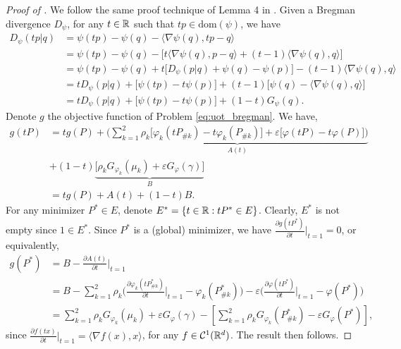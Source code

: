 \begin{proof}[Proof of ]
We follow the same proof technique of Lemma 4 in \citep{Khiem20}.
Given a Bregman divergence $D_{\psi}$, for any $t \in \mathbb R$ such that $tp \in \text{dom}(\psi)$,
we have
\begin{align}
  D_{\psi}(t p | q)
  &= \psi(tp) - \psi(q) - \langle \nabla \psi(q), tp - q \rangle \\
  &= \psi(tp) - \psi(q) - \Big[
    t \langle \nabla \psi(q), p - q \rangle + (t-1) \langle \nabla \psi(q), q \rangle
  \Big] \\
  &= \psi(tp) - \psi(q) + t \Big[ D_{\psi}(p | q) + \psi(q) - \psi(p) \Big]
  - (t-1) \langle \nabla \psi(q), q \rangle \\
  &= t D_{\psi}(p | q) + \big[ \psi(tp) - t \psi(p) \big]
  + (t-1) \big[ \psi(q) - \langle \nabla \psi(q), q \rangle \big] \\
  &= t D_{\psi}(p | q) + \big[ \psi(tp) - t \psi(p) \big] + (1 - t) G_{\psi}(q).
\end{align}
Denote $g$ the objective function of Problem \eqref{eq:uot_bregman}. We have,
\begin{align}
  g(tP) &= t g(P) +
  \underbrace{\Big( \sum_{k=1}^2 \rho_k \big[ \varphi_k(tP_{\# k}) - t \varphi_k(P_{\# k}) \big]
  + \varepsilon \big[ \varphi(tP) - t \varphi(P) \big] \Big)}_{A(t)} \\
  &+ (1 - t) \underbrace{\big[ \rho_k G_{\varphi_k}(\mu_k) + \varepsilon G_{\varphi}(\gamma) \big]}_{B} \\
    &= t g(P) + A(t) + (1 - t) B.
\end{align}
For any minimizer $P^* \in E$, denote $E^* =\{ t \in \mathbb R: tP^* \in E \}$. Clearly,
$E^*$ is not empty since $1 \in E^*$. Since $P^*$ is a (global) minimizer, we have
$\frac{\partial g(tP^*)}{\partial t} \Big |_{t = 1} = 0$,
or equivalently,
\begin{align}
  g(P^*) &= B - \frac{\partial A(t)}{\partial t} \bigg|_{t=1} \\
  &= B - \sum_{k=1}^2
  \rho_k \Bigg( \frac{\partial \varphi_k(tP^*_{\# k})}{\partial t} \bigg|_{t=1} - \varphi_k(P^*_{\# k}) \Bigg)
  - \varepsilon \Bigg( \frac{\partial \varphi(tP^*)}{\partial t} \bigg|_{t=1} - \varphi(P^*) \Bigg) \\
  &= \sum_{k=1}^2 \rho_k G_{\varphi_k}(\mu_k) + \varepsilon G_{\varphi}(\gamma)
- \left[ \sum_{k=1}^2 \rho_k G_{\varphi_k}(P^*_{\# k}) - \varepsilon G_{\varphi}(P^*) \right],
\end{align}
since $\frac{\partial f(tx)}{ \partial t} \Big |_{t=1} = \langle \nabla f(x), x \rangle$,
for any $f \in \mathcal C^1(\mathbb R^d)$. The result then follows.
\end{proof}

